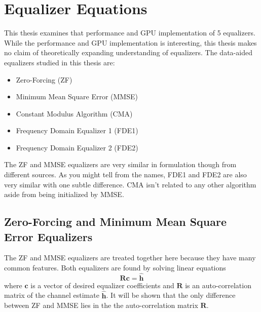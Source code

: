 
\chapter{Equalizer Equations}
\label{chap:eq_eq}
This thesis examines that performance and GPU implementation of 5 equalizers.
While the performance and GPU implementation is interesting, this thesis makes no claim of theoretically expanding understanding of equalizers.
The data-aided equalizers studied in this thesis are:
\begin{itemize}
\item Zero-Forcing (ZF)
\item Minimum Mean Square Error (MMSE)
\item Constant Modulus Algorithm (CMA)
\item Frequency Domain Equalizer 1 (FDE1)
\item Frequency Domain Equalizer 2 (FDE2)
\end{itemize}
The ZF and MMSE equalizers are very similar in formulation though from different sources.
As you might tell from the names, FDE1 and FDE2 are also very similar with one subtle difference.
CMA isn't related to any other algorithm aside from being initialized by MMSE.

\section{Zero-Forcing and Minimum Mean Square Error Equalizers}
\label{sec:ZFnMMSE}
The ZF and MMSE equalizers are treated together here because they have many common features.
Both equalizers are found by solving linear equations
\begin{equation}
\mathbf{R}\mathbf{c} = \hat{\mathbf{h}}
\end{equation}
where $\mathbf{c}$ is a vector of desired equalizer coefficients
and $\mathbf{R}$ is an auto-correlation matrix of the channel estimate $\hat{\mathbf{h}}$.
It will be shown that the only difference between ZF and MMSE lies in the the auto-correlation matrix $\mathbf{R}$.

